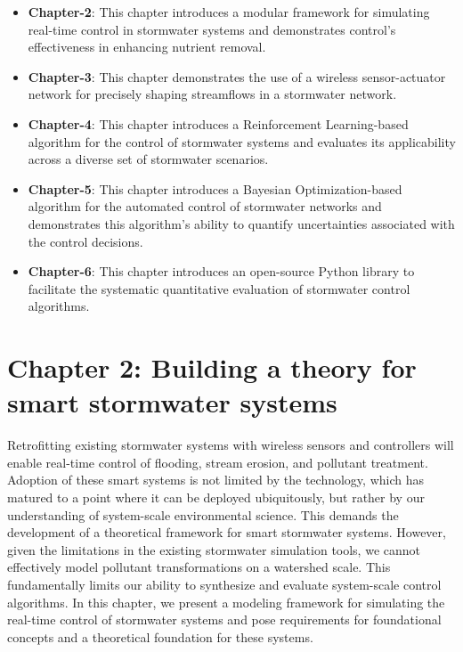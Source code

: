 \begin{itemize}
	\item \textbf{Chapter-2}: This chapter introduces a modular framework for simulating real-time control in stormwater systems and demonstrates control's effectiveness in enhancing nutrient removal.
	\item \textbf{Chapter-3}: This chapter demonstrates the use of a wireless sensor-actuator network for precisely shaping streamflows in a stormwater network.
	\item \textbf{Chapter-4}: This chapter introduces a Reinforcement Learning-based algorithm for the control of stormwater systems and evaluates its applicability across a diverse set of stormwater scenarios.
	\item \textbf{Chapter-5}: This chapter introduces a Bayesian Optimization-based algorithm for the automated control of stormwater networks and demonstrates this algorithm's ability to quantify uncertainties associated with the control decisions. 
	\item \textbf{Chapter-6}: This chapter introduces an open-source Python library to facilitate the systematic quantitative evaluation of stormwater control algorithms.
\end{itemize}
 

\section{Chapter 2: Building a theory for smart stormwater systems}

Retrofitting existing stormwater systems with wireless sensors and controllers will enable real-time control of flooding, stream erosion, and pollutant treatment. 
Adoption of these smart systems is not limited by the technology, which has matured to a point where it can be deployed ubiquitously, but rather by our understanding of system-scale environmental science.
This demands the development of a theoretical framework for smart stormwater systems.
However, given the limitations in the existing stormwater simulation tools, we cannot effectively model pollutant transformations on a watershed scale.
This fundamentally limits our ability to synthesize and evaluate system-scale control algorithms. 
In this chapter, we present a modeling framework for simulating the real-time control of stormwater systems and pose requirements for foundational concepts and a theoretical foundation for these systems. 

\

